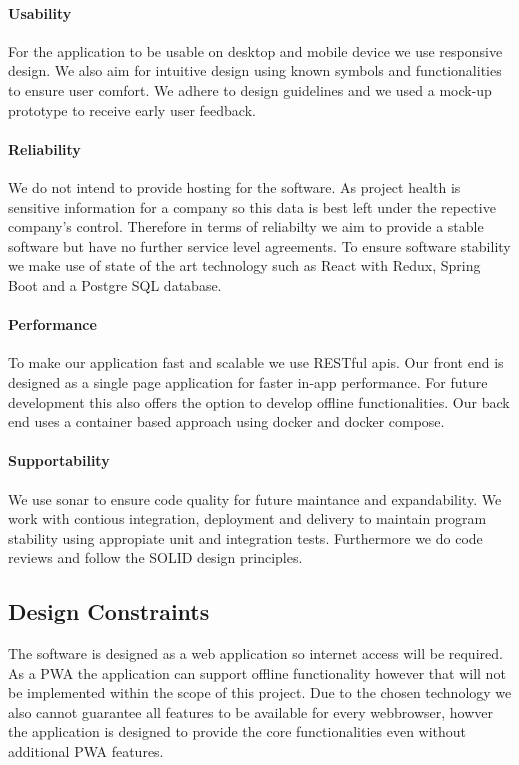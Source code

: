\paragraph*{Usability}
\label{sec:domainBca}
For the application to be usable on desktop and mobile device we use responsive design. We also aim for intuitive design using known symbols and functionalities to ensure user comfort. We adhere to design guidelines and we used a mock-up prototype to receive early user feedback.
\paragraph*{Reliability}
\label{sec:domainBcb}
We do not intend to provide hosting for the software. As project health is sensitive information for a company so this data is best left under the repective company's control. Therefore in terms of reliabilty we aim to provide a stable software but have no further service level agreements. To ensure software stability we make use of state of the art technology such as React with Redux, Spring Boot and a Postgre SQL database.
\paragraph*{Performance}
\label{sec:domainBcc}
To make our application fast and scalable we use RESTful apis. Our front end is designed as a single page application for faster in-app performance. For future development this also offers the option to develop offline functionalities. Our back end uses a container based approach using docker and docker compose.
\paragraph*{Supportability}
\label{sec:domainBcd}
We use sonar to ensure code quality for future maintance and expandability. We work with contious integration, deployment and delivery to maintain program stability using appropiate unit and integration tests. Furthermore we do code reviews and follow the SOLID design principles.  

\subsection{Design Constraints}
\label{sec:domainBd}
The software is designed as a web application so internet access will be required. As a PWA the application can support offline functionality however that will not be implemented within the scope of this project. Due to the chosen technology we also cannot guarantee all features to be available for every webbrowser, howver the application is designed to provide the core functionalities even without additional PWA features.


